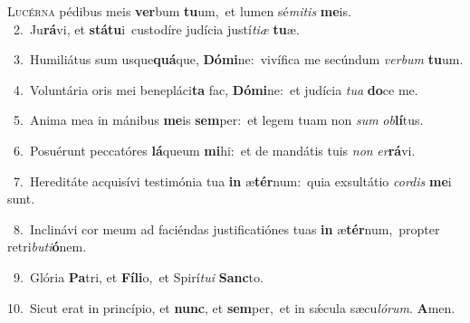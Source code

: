 \lettrine{\initial\textcolor{\initialcolor}{L}}{ucérna} pédibus meis \textbf{ver}\-bum \textbf{tu}\-um,~\star et lumen sé\-\textit{mi}\-\textit{tis} \textbf{me}\-is.\\
{\numbfont\textcolor{\numbcolor}{~2.}}~Ju\-\textbf{rá}\-vi, et \textbf{stá}\-\textbf{tu}i~\star custodíre judícia justí\-\textit{ti}\-\textit{æ} \textbf{tu}\-æ.\par
{\numbfont\textcolor{\numbcolor}{~3.}}~Humiliátus sum usque\-\textbf{quá}\-que, \textbf{Dó}\-\textbf{mi}ne:~\star vivífica me secúndum \textit{ver}\-\textit{bum} \textbf{tu}\-um.\par
{\numbfont\textcolor{\numbcolor}{~4.}}~Voluntária oris mei benepláci\textbf{ta} fac, \textbf{Dó}\-\textbf{mi}ne:~\star et judícia \textit{tu}\-\textit{a} \textbf{do}\-ce me.\par
{\numbfont\textcolor{\numbcolor}{~5.}}~Anima mea in mánibus \textbf{me}\-is \textbf{sem}\-per:~\star et legem tuam non \textit{sum} \textit{ob}\-\textbf{lí}tus.\par
{\numbfont\textcolor{\numbcolor}{~6.}}~Posuérunt peccatóres \textbf{lá}\-queum \textbf{mi}\-hi:~\star et de mandátis tuis \textit{non} \textit{er}\-\textbf{rá}vi.\par
{\numbfont\textcolor{\numbcolor}{~7.}}~Hereditáte acquisívi testimónia tua \textbf{in} æ\-\textbf{tér}\-num:~\star quia exsultátio \textit{cor}\-\textit{dis} \textbf{me}\-i sunt.\par
{\numbfont\textcolor{\numbcolor}{~8.}}~Inclinávi cor meum ad faciéndas justificatiónes tuas \textbf{in} æ\-\textbf{tér}\-num,~\star propter retri\-\textit{bu}\-\textit{ti}\textbf{ó}nem.\par
{\numbfont\textcolor{\numbcolor}{~9.}}~Glória \textbf{Pa}\-tri, et \textbf{Fí}\-\textbf{li}o,~\star et Spirí\-\textit{tu}\-\textit{i} \textbf{Sanc}\-to.\par
{\numbfont\textcolor{\numbcolor}{10.}}~Sicut erat in princípio, et \textbf{nunc}\-, et \textbf{sem}\-per,~\star et in sǽcula sæcu\-\textit{ló}\-\textit{rum}. \textbf{A}\-men.\par
